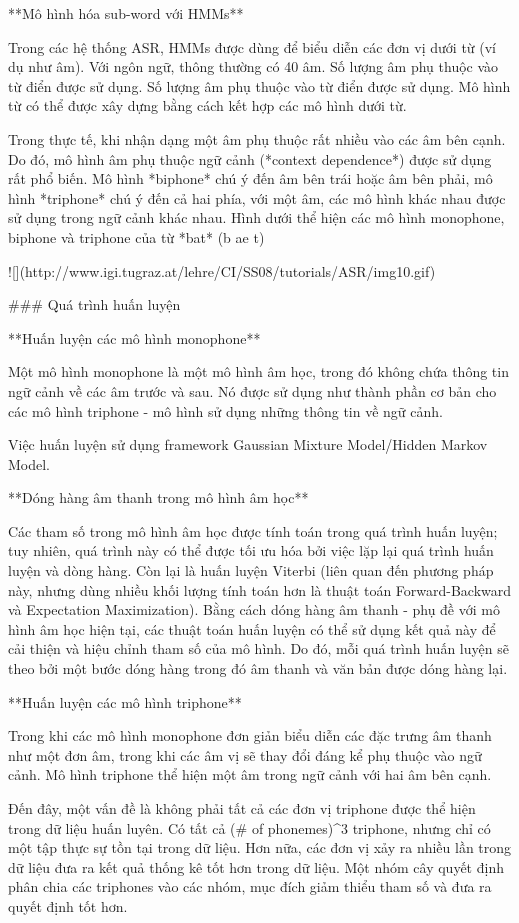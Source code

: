 **Mô hình hóa sub-word với HMMs**

Trong các hệ thống ASR, HMMs được dùng để biểu diễn các đơn vị dưới từ (ví dụ như âm). Với ngôn ngữ, thông thường có 40 âm. Số lượng âm phụ thuộc vào từ điển được sử dụng. Số lượng âm phụ thuộc vào từ điển được sử dụng. Mô hình từ có thể được xây dựng bằng cách kết hợp các mô hình dưới từ.

Trong thực tế, khi nhận dạng một âm phụ thuộc rất nhiều vào các âm bên cạnh. Do đó, mô hình âm phụ thuộc ngữ cảnh (*context dependence*) được sử dụng rất phổ biến. Mô hình *biphone* chú ý đến âm bên trái hoặc âm bên phải, mô hình *triphone* chú ý đến cả hai phía, với một âm, các mô hình khác nhau được sử dụng trong ngữ cảnh khác nhau. Hình dưới thể hiện các mô hình monophone, biphone và triphone của từ *bat* (b ae t)

![](http://www.igi.tugraz.at/lehre/CI/SS08/tutorials/ASR/img10.gif)

### Quá trình huấn luyện

**Huấn luyện các mô hình monophone**

Một mô hình monophone là một mô hình âm học, trong đó không chứa thông tin ngữ cảnh về các âm trước và sau. Nó được sử dụng như thành phần cơ bản cho các mô hình triphone - mô hình sử dụng những thông tin về ngữ cảnh.

Việc huấn luyện sử dụng framework Gaussian Mixture Model/Hidden Markov Model.

**Dóng hàng âm thanh trong mô hình âm học**

Các tham số trong mô hình âm học được tính toán trong quá trình huấn luyện; tuy nhiên, quá trình này có thể được tối ưu hóa bởi việc lặp lại quá trình huấn luyện và dòng hàng. Còn lại là huấn luyện Viterbi (liên quan đến phương pháp này, nhưng dùng nhiều khối lượng tính toán hơn là thuật toán Forward-Backward và Expectation Maximization). Bằng cách dóng hàng âm thanh - phụ đề với mô hình âm học hiện tại, các thuật toán huấn luyện có thể sử dụng kết quả này để cải thiện và hiệu chỉnh tham số của mô hình. Do đó, mỗi quá trình huấn luyện sẽ theo bởi một bước dóng hàng trong đó âm thanh và văn bản được dóng hàng lại.

**Huấn luyện các mô hình triphone**

Trong khi các mô hình monophone đơn giản biểu diễn các đặc trưng âm thanh như một đơn âm, trong khi các âm vị sẽ thay đổi đáng kể phụ thuộc vào ngữ cảnh. Mô hình triphone thể hiện một âm trong ngữ cảnh với hai âm bên cạnh.

Đến đây, một vấn đề là không phải tất cả các đơn vị triphone được thể hiện trong dữ liệu huấn luyên. Có tất cả (# of phonemes)^3 triphone, nhưng chỉ có một tập thực sự tồn tại trong dữ liệu. Hơn nữa, các đơn vị xảy ra nhiều lần trong dữ liệu đưa ra kết quả thống kê tốt hơn trong dữ liệu. Một nhóm cây quyết định phân chia các triphones vào các nhóm, mục đích giảm thiểu tham số và đưa ra quyết định tốt hơn.

